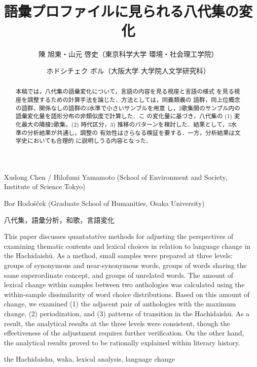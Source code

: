 \documentclass[submit]{ipsj}
\date{}
\title{}
\begin{document}
\title{語彙プロファイルに見られる八代集の変化}


\author{陳 旭東・山元 啓史（東京科学大学 環境・社会理工学院）}{Xudong Chen / Hilofumi Yamamoto (School of Environment and Society, Institute of Science Tokyo)}{}
\author{ホドシチェク ボル（大阪大学 大学院人文学研究科）}{Bor Hodo\v{s}\v{c}ek (Graduate School of Humanities, Osaka University)}{}

\begin{abstract}
  本稿では，八代集の語彙変化について，言語の内容を見る視座と言語の様式
  を見る視座を調整するための計算手法を論じた．方法としては，同義類義の
  語群，同上位概念の語群，関係なしの語群の3水準で小さいサンプルを用意
  し，2歌集間のサンプル内の語彙変化量を語形分布の非類似度で計算した．こ
  の変化量に基づき，八代集の (1) 変化最大の隣接2歌集，(2) 時代区分，3)
  推移のパターンを検討した．結果として，3水準の分析結果が共通し，調整の
  有効性はさらなる検証を要する．一方，分析結果は文学史においても合理的
  に説明しうる内容となった．
\end{abstract}

\begin{jkeyword}
  八代集，語彙分析，和歌，言語変化
\end{jkeyword}

\begin{eabstract}
  This paper discusses quantatative methods for adjusting the
  perspectives of examining thematic contents and lexical choices in
  relation to language change in the Hachidaishū. As a method, small
  samples were prepared at three levels: groups of synonymous and
  near-synonymous words, groups of words sharing the same
  superordinate concept, and groups of unrelated words. The amount of
  lexical change within samples between two anthologies was calculated
  using the within-sample dissimilarity of word choice
  distributions. Based on this amount of change, we examined (1) the
  adjacent pair of anthologies with the maximum change, (2)
  periodization, and (3) patterns of transition in the Hachidaishū. As
  a result, the analytical results at the three levels were
  consistent, though the effectiveness of the adjustment requires
  further verification. On the other hand, the analytical results
  proved to be rationally explained within literary history.
\end{eabstract}

\begin{ekeyword}
the Hachidaishu, waka, lexical analysis, language change
\end{ekeyword}
\end{document}
